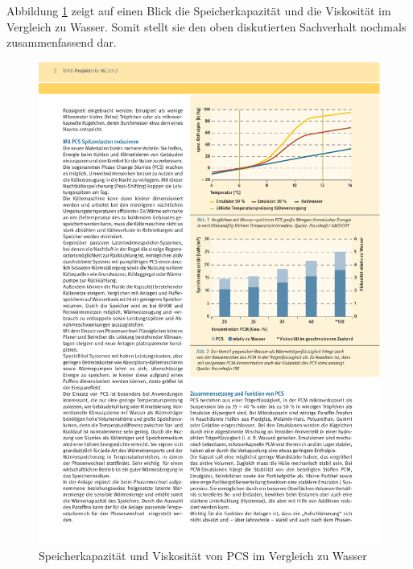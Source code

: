 \documentclass[11pt,a4paper]{scrartcl}
\begin{document}
Abbildung \ref{fig:BINEVisko} zeigt auf einen Blick die Speicherkapazität und die
Viskosität im Vergleich zu Wasser. Somit stellt sie den oben diskutierten
Sachverhalt nochmals zusammenfassend dar.
\begin{figure}[h!]
\begin{center}
\includegraphics[scale=0.8]{images/BineVisko.pdf}
\caption{Speicherkapazität und Viskosität von PCS im Vergleich zu Wasser
\cite{BINE3}}
\label{fig:BINEVisko}
\end{center}
\end{figure}
\end{document}
